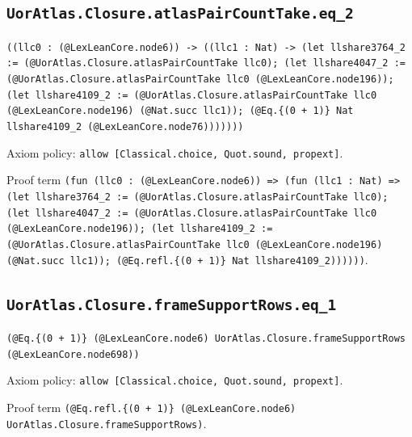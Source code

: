 \documentclass[11pt]{article}
\begin{document}
\subsection*{\texttt{UorAtlas.Closure.atlasPairCountTake.eq\_2}}
\noindent\texttt{((llc0 : (@LexLeanCore.node6)) -> ((llc1 : Nat) -> (let llshare3764\_2 := (@UorAtlas.Closure.atlasPairCountTake llc0); (let llshare4047\_2 := (@UorAtlas.Closure.atlasPairCountTake llc0 (@LexLeanCore.node196)); (let llshare4109\_2 := (@UorAtlas.Closure.atlasPairCountTake llc0 (@LexLeanCore.node196) (@Nat.succ llc1)); (@Eq.\{(0 + 1)\} Nat llshare4109\_2 (@LexLeanCore.node76)))))))}\par
\noindent Axiom policy: \texttt{allow [Classical.choice, Quot.sound, propext]}.\par
\noindent Proof term \texttt{(fun (llc0 : (@LexLeanCore.node6)) => (fun (llc1 : Nat) => (let llshare3764\_2 := (@UorAtlas.Closure.atlasPairCountTake llc0); (let llshare4047\_2 := (@UorAtlas.Closure.atlasPairCountTake llc0 (@LexLeanCore.node196)); (let llshare4109\_2 := (@UorAtlas.Closure.atlasPairCountTake llc0 (@LexLeanCore.node196) (@Nat.succ llc1)); (@Eq.refl.\{(0 + 1)\} Nat llshare4109\_2))))))}.\par
\subsection*{\texttt{UorAtlas.Closure.frameSupportRows.eq\_1}}
\noindent\texttt{(@Eq.\{(0 + 1)\} (@LexLeanCore.node6) UorAtlas.Closure.frameSupportRows (@LexLeanCore.node698))}\par
\noindent Axiom policy: \texttt{allow [Classical.choice, Quot.sound, propext]}.\par
\noindent Proof term \texttt{(@Eq.refl.\{(0 + 1)\} (@LexLeanCore.node6) UorAtlas.Closure.frameSupportRows)}.\par
\end{document}
